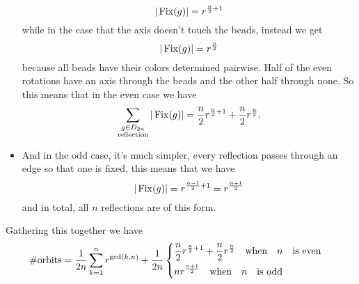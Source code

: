 \documentclass[12pt]{memoir}
\begin{document}
\begin{ptcbr}
\begin{itemize}
    $$|\operatorname{Fix}(g)|=r^{\frac{n}{2}+1}$$
    while in the case that the axis doesn't touch the beads, instead we get 
    $$|\operatorname{Fix}(g)|=r^{\frac{n}{2}}$$
    because all beads have their colors determined pairwise. 
    Half of the even rotations have an axis through the beads and the other half through none. So this means that in the even case we have 
    $$\sum_{\substack{g\in D_{2n}\\\text{reflection}}}|\operatorname{Fix}(g)|=\frac{n}{2}r^{\frac{n}{2}+1}+\frac{n}{2}r^{\frac{n}{2}}.$$
    \item And in the odd case, it's much simpler, every reflection passes through an edge so that one is fixed, this means that we have 
    $$|\operatorname{Fix}(g)|=r^{\frac{n-1}{2}+1}=r^{\frac{n+1}{2}}$$
    and in total, all $n$ reflections are of this form. 
\end{itemize}
Gathering this together we have 
$$\#\text{orbits}=\frac{1}{2n}\sum_{k=1}^nr^{\gcd(k,n)}+\frac{1}{2n}\left\lbrace
\begin{aligned}
    &\frac{n}{2}r^{\frac{n}{2}+1}+\frac{n}{2}r^{\frac{n}{2}}\quad\text{when}\quad n\quad\text{is even}\quad\\
    &nr^{\frac{n+1}{2}}\quad\text{when}\quad n\quad\text{is odd}\quad
\end{aligned}
\right.$$
\end{ptcbr}
\end{document}
